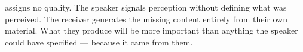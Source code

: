 assigns no quality. 
The speaker signals perception without defining what was perceived. 
The receiver generates the missing content entirely from their own material. 
What they produce will be more important than anything the speaker could have specified --- because 
it came from them.